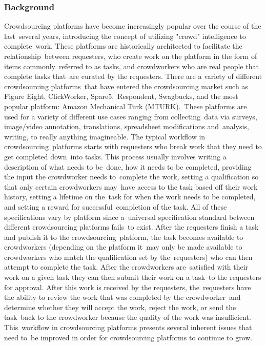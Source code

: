 \documentclass[letterpaper,12pt]{article}
\begin{document}
\subsubsection{Background}
Crowdsourcing platforms have become increasingly popular over the course of the last\ 
several years, introducing the concept of utilizing "crowd" intelligence to complete\
work. \cite{kuek2015global} These platforms are historically architected to facilitate the relationship\ 
between requesters, who create work on the platform in the form of items commonly\ 
referred to as tasks, and crowdworkers who are real people that complete tasks that\ 
are curated by the requesters. There are a variety of different crowdsourcing platforms\ 
that have entered the crowdsourcing market such as Figure Eight, ClickWorker, Spare5,\ 
Respondent, Swagbucks, and the most popular platform: Amazon Mechanical Turk (MTURK).\ 
These platforms are used for a variety of different use cases ranging from collecting\
data via surveys, image/video annotation, translations, spreadsheet modifications and\ 
analysis, writing, to really anything imagineable. The typical workflow in crowdsourcing\ 
platforms starts with requesters who break work that they need to get completed down\ 
into tasks. This process usually involves writing a description of what needs to be\ 
 done, how it needs to be completed, providing the input the crowdworker needs to\ 
 complete the work, setting a qualification so that only certain crowdworkers may\ 
 have access to the task based off their work history, setting a lifetime on the\ 
  task for when the work needs to be completed, and setting a reward for successful\ 
  completion of the task. All of these specifications vary by platform since a\ 
  universal specification standard between different crowdsourcing platforms fails\ 
  to exist. After the requesters finish a task and publish it to the crowdsourcing\ 
  platform, the task becomes available to crowdworkers (depending on the platform it\ 
  may only be made available to crowdworkers who match the qualification set by the\ 
  requesters) who can then attempt to complete the task. After the crowdworkers are\ 
  satisfied with their work on a given task they can then submit their work on a task\ 
  to the requesters for approval. After this work is received by the requesters, the\ 
  requesters have the ability to review the work that was completed by the crowdworker\
   and determine whether they will accept the work, reject the work, or send the task\ 
   back to the crowdworker because the quality of the work was insufficient. This\ 
   workflow in crowdsourcing platforms presents several inherent issues that need to\ 
   be improved in order for crowdsourcing platforms to continue to grow.
\end{document}
